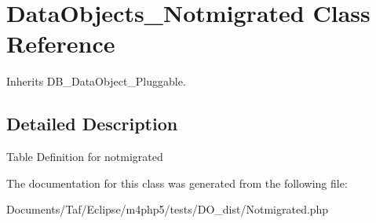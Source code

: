 \hypertarget{classDataObjects__Notmigrated}{
\section{DataObjects\_\-Notmigrated Class Reference}
\label{classDataObjects__Notmigrated}
}
Inherits DB\_\-DataObject\_\-Pluggable.



\subsection{Detailed Description}
Table Definition for notmigrated 

The documentation for this class was generated from the following file:\begin{CompactItemize}
\item 
Documents/Taf/Eclipse/m4php5/tests/DO\_\-dist/Notmigrated.php\end{CompactItemize}
